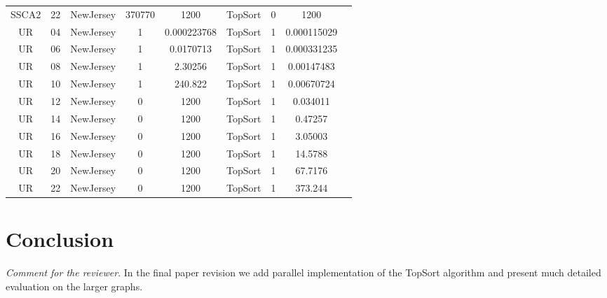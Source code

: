 \documentclass{svproc}
\begin{document}
\begin{table}[]
\begin{center}
\begin{tabular}{c|c|c|c|c|c|c|c|c}
SSCA2 & 22 & NewJersey & 370770 & 1200 & TopSort & 0 & 1200 \\
UR & 04 & NewJersey & 1 & 0.000223768 & TopSort & 1 & 0.000115029 \\
UR & 06 & NewJersey & 1 & 0.0170713 & TopSort & 1 & 0.000331235 \\
UR & 08 & NewJersey & 1 & 2.30256 & TopSort & 1 & 0.00147483 \\
UR & 10 & NewJersey & 1 & 240.822 & TopSort & 1 & 0.00670724 \\
UR & 12 & NewJersey & 0 & 1200 & TopSort & 1 & 0.034011 \\
UR & 14 & NewJersey & 0 & 1200 & TopSort & 1 & 0.47257 \\
UR & 16 & NewJersey & 0 & 1200 & TopSort & 1 & 3.05003 \\
UR & 18 & NewJersey & 0 & 1200 & TopSort & 1 & 14.5788 \\
UR & 20 & NewJersey & 0 & 1200 & TopSort & 1 & 67.7176 \\
UR & 22 & NewJersey & 0 & 1200 & TopSort & 1 & 373.244
\end{tabular}
\end{center}
\end{table}

%

%
\section{Conclusion}

\textit{Comment for the reviewer}. In the final paper revision we add parallel implementation of the TopSort algorithm and present much detailed evaluation on the larger graphs. 

%
%


\end{document}

